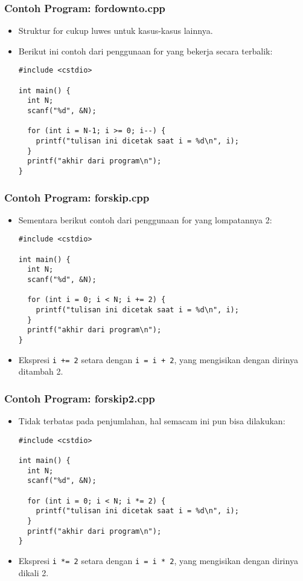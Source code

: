 \begin{frame}[fragile]
\frametitle{Contoh Program: fordownto.cpp}
\begin{itemize}
  \item Struktur for cukup luwes untuk kasus-kasus lainnya.
  \item Berikut ini contoh dari penggunaan for yang bekerja secara terbalik:
\begin{lstlisting}
#include <cstdio>

int main() {
  int N;
  scanf("%d", &N);

  for (int i = N-1; i >= 0; i--) {
    printf("tulisan ini dicetak saat i = %d\n", i);
  }
  printf("akhir dari program\n");
}
\end{lstlisting}
\end{itemize}
\end{frame}

\begin{frame}[fragile]
\frametitle{Contoh Program: forskip.cpp}
\begin{itemize}
  \item Sementara berikut contoh dari penggunaan for yang lompatannya 2:
\begin{lstlisting}
#include <cstdio>

int main() {
  int N;
  scanf("%d", &N);

  for (int i = 0; i < N; i += 2) {
    printf("tulisan ini dicetak saat i = %d\n", i);
  }
  printf("akhir dari program\n");
}
\end{lstlisting}
  \item Ekspresi \texttt{i += 2} setara dengan \texttt{i = i + 2}, yang mengisikan  dengan dirinya ditambah 2.
\end{itemize}
\end{frame}

\begin{frame}[fragile]
\frametitle{Contoh Program: forskip2.cpp}
\begin{itemize}
  \item Tidak terbatas pada penjumlahan, hal semacam ini pun bisa dilakukan:
\begin{lstlisting}
#include <cstdio>

int main() {
  int N;
  scanf("%d", &N);

  for (int i = 0; i < N; i *= 2) {
    printf("tulisan ini dicetak saat i = %d\n", i);
  }
  printf("akhir dari program\n");
}
\end{lstlisting}
  \item Ekspresi \texttt{i *= 2} setara dengan \texttt{i = i * 2}, yang mengisikan  dengan dirinya dikali 2.
\end{itemize}
\end{frame}


